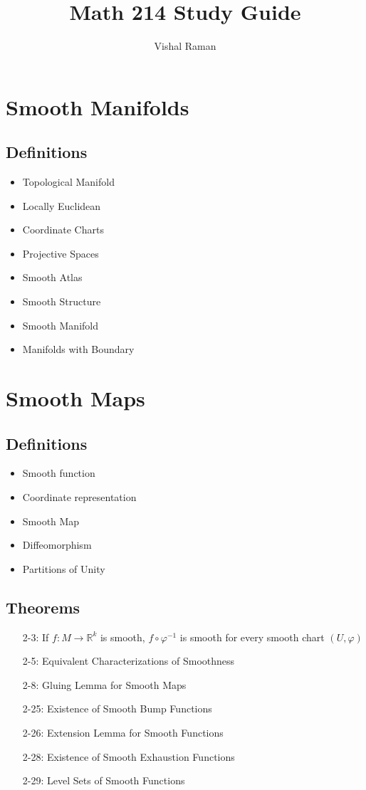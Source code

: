 \documentclass[11.5pt]{scrartcl}
\newcommand{\R}{\mathbb{R}}
\newcommand{\<}{\langle}
\renewcommand{\>}{\rangle}
\let \phi \varphi
\begin{document}
\title{Math 214 Study Guide}
\author{Vishal Raman}
\maketitle
\tableofcontents

\pagebreak
\section{Smooth Manifolds}
\subsection{Definitions}
\begin{itemize}
\item Topological Manifold
\item Locally Euclidean
\item Coordinate Charts
\item Projective Spaces
\item Smooth Atlas
\item Smooth Structure
\item Smooth Manifold
\item Manifolds with Boundary
\end{itemize}

\section{Smooth Maps}
\subsection{Definitions}
\begin{itemize}
\item Smooth function
\item Coordinate representation
\item Smooth Map
\item Diffeomorphism
\item Partitions of Unity

\end{itemize}
\subsection{Theorems}
\begin{itemize}
\item[2-3:] If $f: M \to \R^k$ is smooth, $f \circ \phi^{-1}$ is smooth for every smooth chart $(U, \phi)$
\item[2-5:] Equivalent Characterizations of Smoothness
\item[2-8:] Gluing Lemma for Smooth Maps
\item[2-25:] Existence of Smooth Bump Functions
\item[2-26:] Extension Lemma for Smooth Functions
\item[2-28:] Existence of Smooth Exhaustion Functions
\item[2-29:] Level Sets of Smooth Functions
\end{itemize}
\end{document}
